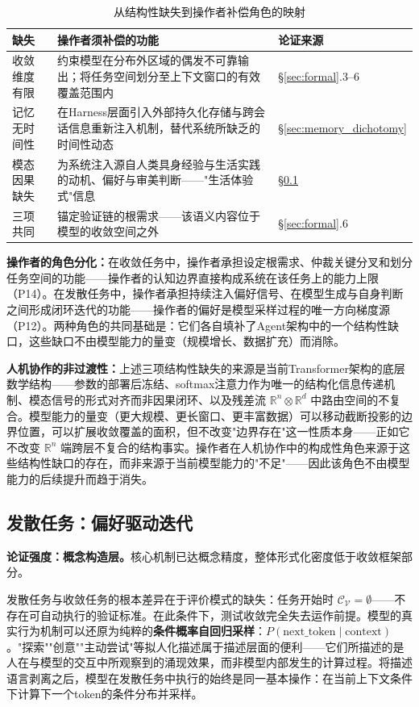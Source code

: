\documentclass[11pt,a4paper]{article}
\theoremstyle{definition}
\newcommand{\verifspace}{\mathcal{C}_{\mathcal{V}}}
\begin{document}
\begin{table}[H]
\centering
\caption{从结构性缺失到操作者补偿角色的映射}
\begin{tabular}{@{}p{2.5cm}p{5.5cm}p{5cm}@{}}
\toprule
\textbf{缺失} & \textbf{操作者须补偿的功能} & \textbf{论证来源} \\
\midrule
收敛维度有限 & 约束模型在分布外区域的偶发不可靠输出；将任务空间划分至上下文窗口的有效覆盖范围内 & \S\ref{sec:formal}.3--6 \\
记忆无时间性 & 在Harness层面引入外部持久化存储与跨会话信息重新注入机制，替代系统所缺乏的时间性动态 & \S\ref{sec:memory_dichotomy} \\
模态因果缺失 & 为系统注入源自人类具身经验与生活实践的动机、偏好与审美判断——"生活体验式"信息 & \S\ref{sec:divergent_formal} \\
三项共同 & 锚定验证链的根需求——该语义内容位于模型的收敛空间之外 & \S\ref{sec:formal}.6 \\
\bottomrule
\end{tabular}
\end{table}

\textbf{操作者的角色分化：}在收敛任务中，操作者承担设定根需求、仲裁关键分叉和划分任务空间的功能——操作者的认知边界直接构成系统在该任务上的能力上限（P14）。在发散任务中，操作者承担持续注入偏好信号、在模型生成与自身判断之间形成闭环迭代的功能——操作者的偏好是模型采样过程的唯一方向梯度源（P12）。两种角色的共同基础是：它们各自填补了Agent架构中的一个结构性缺口，这些缺口不由模型能力的量变（规模增长、数据扩充）而消除。

\textbf{人机协作的非过渡性：}上述三项结构性缺失的来源是当前Transformer架构的底层数学结构——参数的部署后冻结、softmax注意力作为唯一的结构化信息传递机制、模态信号的形式对齐而非因果闭环、以及残差流 $\mathbb{R}^n \otimes \mathbb{R}^d$ 中路由空间的不复合。模型能力的量变（更大规模、更长窗口、更丰富数据）可以移动截断投影的边界位置，可以扩展收敛覆盖的面积，但不改变"边界存在"这一性质本身——正如它不改变 $\mathbb{R}^n$ 端跨层不复合的结构事实。操作者在人机协作中的构成性角色来源于这些结构性缺口的存在，而非来源于当前模型能力的"不足"——因此该角色不由模型能力的后续提升而趋于消失。

\subsection{发散任务：偏好驱动迭代}
\label{sec:divergent_formal}

\textbf{论证强度：概念构造层。}核心机制已达概念精度，整体形式化密度低于收敛框架部分。

发散任务与收敛任务的根本差异在于评价模式的缺失：任务开始时 $\verifspace = \emptyset$——不存在可自动执行的验证标准。在此条件下，测试收敛完全失去运作前提。模型的真实行为机制可以还原为纯粹的\textbf{条件概率自回归采样}：$P(\text{next\_token} \mid \text{context})$。"探索""创意""主动尝试"等拟人化描述属于描述层面的便利——它们所描述的是人在与模型的交互中所观察到的涌现效果，而非模型内部发生的计算过程。将描述语言剥离之后，模型在发散任务中执行的始终是同一基本操作：在当前上下文条件下计算下一个token的条件分布并采样。
\end{document}
